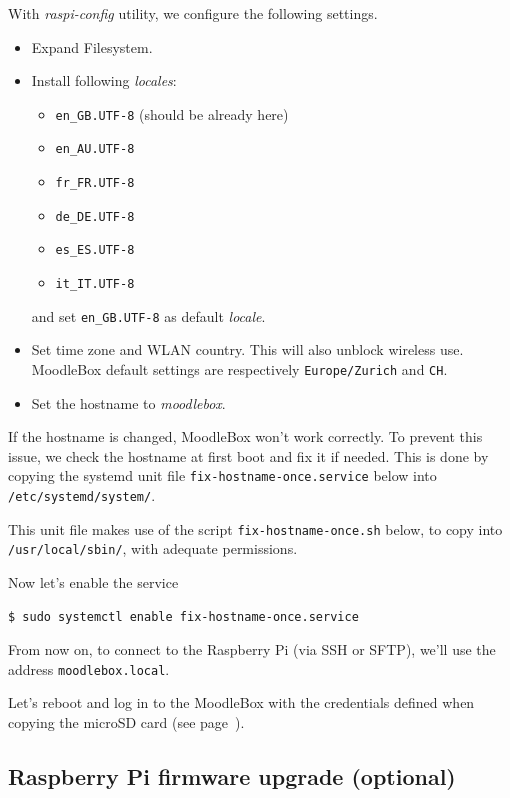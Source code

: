 \documentclass[12pt]{article}
\begin{document}
With \emph{raspi-config} utility, we configure the following settings.
\begin{itemize}
\item Expand Filesystem.
\item Install following \emph{locales}:
\begin{itemize}
\item \lstinline{en_GB.UTF-8} (should be already here)
\item \lstinline{en_AU.UTF-8}
\item \lstinline{fr_FR.UTF-8}
\item \lstinline{de_DE.UTF-8}
\item \lstinline{es_ES.UTF-8}
\item \lstinline{it_IT.UTF-8}
\end{itemize}
and set \lstinline{en_GB.UTF-8} as default \emph{locale}.
\item Set time zone and WLAN country.
This will also unblock wireless use.
MoodleBox default settings are respectively \lstinline{Europe/Zurich} and \lstinline{CH}.
\item Set the hostname to \emph{moodlebox}.
\end{itemize}

If the hostname is changed, MoodleBox won't work correctly.
To prevent this issue, we check the hostname at first boot and fix it if needed.
This is done by copying the systemd unit file \lstinline{fix-hostname-once.service} below into \lstinline{/etc/systemd/system/}.


This unit file makes use of the script \lstinline{fix-hostname-once.sh} below, to copy into \lstinline{/usr/local/sbin/}, with adequate permissions.


Now let's enable the service
\begin{lstlisting}[language=bash]
$ sudo systemctl enable fix-hostname-once.service
\end{lstlisting}

From now on, to connect to the Raspberry Pi (via SSH or SFTP), we'll use the address \lstinline{moodlebox.local}.

Let's reboot and log in to the MoodleBox with the credentials defined when copying the microSD card (see page~\pageref{page-credentials}).

\iffalse
\subsection{Raspberry Pi firmware upgrade (optional)}
\end{document}
